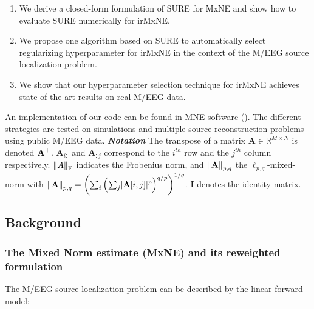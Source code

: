 \begin{enumerate}
    \item We derive a closed-form formulation of SURE for MxNE and show how to evaluate SURE numerically
    for irMxNE.

    \item We propose one algorithm based on SURE to automatically select regularizing hyperparameter for irMxNE
    in the context of the M/EEG source localization problem.

    \item We show that our hyperparameter selection technique for irMxNE achieves state-of-the-art results on real M/EEG data.
\end{enumerate}

An implementation of our code can be found in MNE software (\cite{mne}).
The different strategies are tested on simulations and multiple source reconstruction 
problems using public M/EEG data.
%
\newline
\newline
%
\textit{\textbf{Notation}} The transpose of a matrix $\mathbf{A} \in \mathbb{R}^{M \times N}$ is
denoted $\bf{A}^\top$. $\mathbf{A}_{i:}$ and $\mathbf{A}_{:j}$ correspond to the $i^{th}$
row and the $j^{th}$ column respectively. $\left \lVert A \right \rVert_{\text{F}}$ indicates the Frobenius norm,
and $\left \lVert \mathbf{A} \right \rVert_{p,q}$ the $\ell_{p,q}$-mixed-norm with $\left \lVert \mathbf{A} \right \rVert_{p,q} 
= \left(\sum_i \left(\sum_j \lvert \mathbf{A}[i,j] \rvert^p\right)^{q/p}\right)^{1/q}$.
$\mathbf{I}$ denotes the identity matrix.


\subsection{Background}
\label{sub:background}
%

\subsubsection{The Mixed Norm estimate (MxNE) and its reweighted formulation}

The M/EEG source localization problem can be described by the linear forward model:

